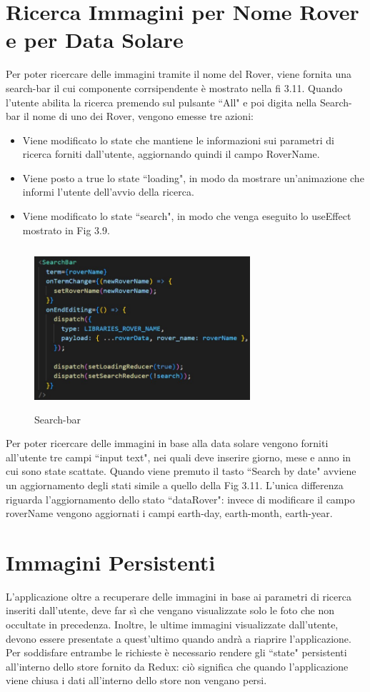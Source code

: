 \section{Ricerca Immagini per Nome Rover e per Data Solare}
Per poter ricercare delle immagini tramite il nome del Rover, viene fornita una search-bar il cui componente corrsipendente \`e mostrato nella fi 3.11. Quando l'utente abilita la ricerca premendo sul pulsante ``All" e poi digita nella Search-bar il nome di uno dei Rover, vengono emesse tre azioni:
\begin{itemize}
    \item Viene modificato lo state che mantiene le informazioni sui parametri di ricerca forniti dall'utente, aggiornando quindi il campo RoverName.
    \item Viene posto a true lo state ``loading", in modo da mostrare un'animazione che informi l'utente dell'avvio della ricerca.
    \item Viene modificato lo state ``search", in modo che venga eseguito lo useEffect mostrato in Fig 3.9.
\end{itemize}
\begin{figure}[h]
    \centering
    \includegraphics[width=8cm, height=6cm]{images/SearchBar.jpg}
    \caption[differenzeiteot]{Search-bar}
    \label{fig:Search-bar}
\end{figure}

Per poter ricercare delle immagini in base alla data solare vengono forniti all'utente tre campi ``input text", nei quali deve inserire giorno, mese e anno in cui sono state scattate.
Quando viene premuto il tasto ``Search by date" avviene un aggiornamento degli stati simile a quello della Fig 3.11. L'unica differenza riguarda l'aggiornamento dello stato ``dataRover": invece di 
modificare il campo roverName vengono aggiornati i campi earth-day, earth-month, earth-year.

\section{Immagini Persistenti}
L'applicazione oltre a recuperare delle immagini in base ai parametri di ricerca inseriti dall'utente, deve far s\`i che vengano visualizzate solo le foto che non occultate in precedenza. Inoltre, le ultime immagini visualizzate dall'utente, devono essere presentate a quest'ultimo quando andr\`a a riaprire l'applicazione.
Per soddisfare entrambe le richieste \`e necessario rendere gli ``state" persistenti all'interno dello store fornito da Redux: ci\`o significa che quando l'applicazione viene chiusa i dati all'interno dello store non vengano persi.

